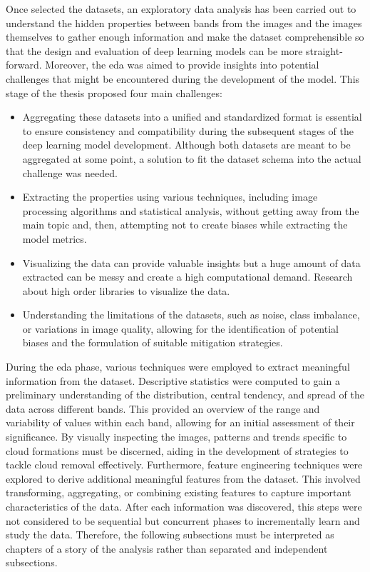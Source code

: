 	Once selected the datasets, an exploratory data analysis has been carried out to understand the hidden properties between bands from the images and the images themselves to gather enough information and make the dataset comprehensible so that the design and evaluation of deep learning models can be more straight-forward. Moreover, the \gls{eda} was aimed to provide insights into potential challenges that might be encountered during the development of the model. This stage of the thesis proposed four main challenges:
\begin{itemize}
	\item Aggregating these datasets into a unified and standardized format is essential to ensure consistency and compatibility during the subsequent stages of the deep learning model development. Although both datasets are meant to be aggregated at some point, a solution to fit the dataset schema into the actual challenge was needed.
	\item Extracting the properties using various techniques, including image processing algorithms and statistical analysis, without getting away from the main topic and, then, attempting not to create biases while extracting the model metrics.
	\item Visualizing the data can provide valuable insights but a huge amount of data extracted can be messy and create a high computational demand. Research about high order libraries to visualize the data.
	\item Understanding the limitations of the datasets, such as noise, class imbalance, or variations in image quality, allowing for the identification of potential biases and the formulation of suitable mitigation strategies.
\end{itemize}
During the \gls{eda} phase, various techniques were employed to extract meaningful information from the dataset. Descriptive statistics were computed to gain a preliminary understanding of the distribution, central tendency, and spread of the data across different bands. This provided an overview of the range and variability of values within each band, allowing for an initial assessment of their significance.
By visually inspecting the images, patterns and trends specific to cloud formations must be discerned, aiding in the development of strategies to tackle cloud removal effectively. Furthermore, feature engineering techniques were explored to derive additional meaningful features from the dataset. This involved transforming, aggregating, or combining existing features to capture important characteristics of the data. After each information was discovered, this steps were not considered to be sequential but concurrent phases to incrementally learn and study the data. Therefore, the following subsections must be interpreted as chapters of a story of the analysis rather than separated and independent subsections.
